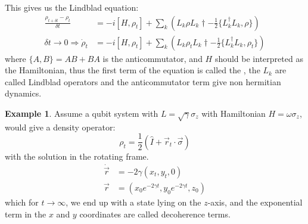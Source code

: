 \documentclass[12pt]{book}
\theoremstyle{definition}
\newtheorem*{expl}{\bfseries Example}
\renewcommand{\v}[1]{\vec{#1}}
\newcommand{\de}{\delta}
\let\oldsum\sum
\renewcommand{\sum}[2]{\oldsum\limits_{#1}^{#2}}
\renewcommand{\to}{\longrightarrow}
\newcommand{\si}{\sigma}
\newcommand{\para}[1]{\left( {#1} \right)}
\begin{document}
This gives us the Lindblad equation:
\begin{align*}
  \frac{\rho_{t + \de t} - \rho_t}{\de t} & = - i [H, \rho_t] + \oldsum_k \para{L_k \rho L_k\dagger - \frac{1}{2} \{L_k^\dagger L_k, \rho\}} \\
  \de t \to 0 \Longrightarrow \dot{\rho}_t & = - i [H, \rho_t] + \oldsum_k \para{L_k \rho_t L_k\dagger - \frac{1}{2} \{L_k^\dagger L_k, \rho_t\}}
\end{align*}
where $\{A, B\} = AB + BA$ is the anticommutator, and $H$ should be interpreted as the Hamiltonian, thus the first term of the equation is called the , the $L_k$ are called Lindblad operators and the anticommutator term give non hermitian dynamics.

\begin{expl}
Assume a qubit system with $L = \sqrt{\gamma} \si_z$ with Hamiltonian $H = \omega \si_z$, would give a density operator:
\begin{equation*}
  \rho_t = \frac{1}{2} (\hat I + \v r_t \cdot \v \si)
\end{equation*}
with the solution in the rotating frame.
\begin{align*}
  \dot{\v r} & = - 2 \gamma (x_t, y_t, 0) \\
  \v r & = (x_0 e^{-2 \gamma t}, y_0 e^{-2 \gamma t}, z_0)
\end{align*}
which for $t \to \infty$, we end up with a state lying on the $z$-axis, and the exponential term in the $x$ and $y$ coordinates are called decoherence terms.
\end{expl}
\end{document}
